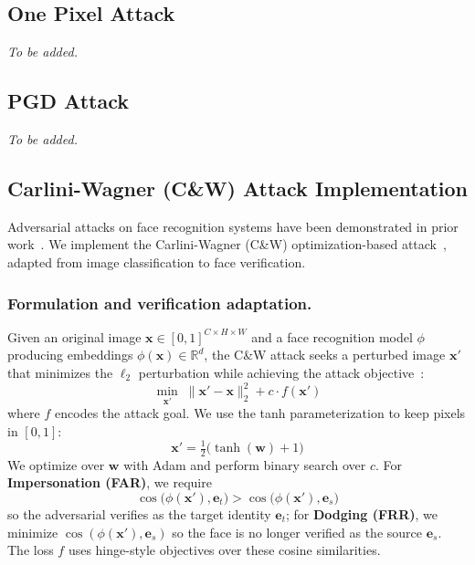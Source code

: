 \documentclass[cameraready]{Interspeech}
\begin{document}
\subsection{One Pixel Attack}
\emph{To be added.}

\subsection{PGD Attack}
\emph{To be added.}

\subsection{Carlini-Wagner (C\&W) Attack Implementation}
Adversarial attacks on face recognition systems have been demonstrated in prior work~\cite{Sharif2016}. We implement the Carlini-Wagner (C\&W) optimization-based attack~\cite{Zachariah2023CW}, adapted from image classification to face verification.

\subsubsection{Formulation and verification adaptation.}
Given an original image $\mathbf{x} \in [0,1]^{C \times H \times W}$ and a face recognition model $\phi$ producing embeddings $\phi(\mathbf{x}) \in \mathbb{R}^d$, the C\&W attack seeks a perturbed image $\mathbf{x}'$ that minimizes the $\ell_2$ perturbation while achieving the attack objective~\cite{ArcFace}:
\begin{equation}
\min_{\mathbf{x}'} \; \lVert \mathbf{x}' - \mathbf{x} \rVert_2^2 + c \cdot f(\mathbf{x}')
\end{equation}
where $f$ encodes the attack goal. We use the tanh parameterization to keep pixels in $[0,1]$:
\begin{equation}
\mathbf{x}' = \tfrac{1}{2}\bigl(\tanh(\mathbf{w}) + 1\bigr)
\end{equation}
We optimize over $\mathbf{w}$ with Adam and perform binary search over $c$. For \textbf{Impersonation (FAR)}, we require
\begin{equation}
\cos\bigl(\phi(\mathbf{x}'), \mathbf{e}_t\bigr) > \cos\bigl(\phi(\mathbf{x}'), \mathbf{e}_s\bigr)
\end{equation}
so the adversarial verifies as the target identity $\mathbf{e}_t$; for \textbf{Dodging (FRR)}, we minimize $\cos(\phi(\mathbf{x}'), \mathbf{e}_s)$ so the face is no longer verified as the source $\mathbf{e}_s$. The loss $f$ uses hinge-style objectives over these cosine similarities.
\end{document}
